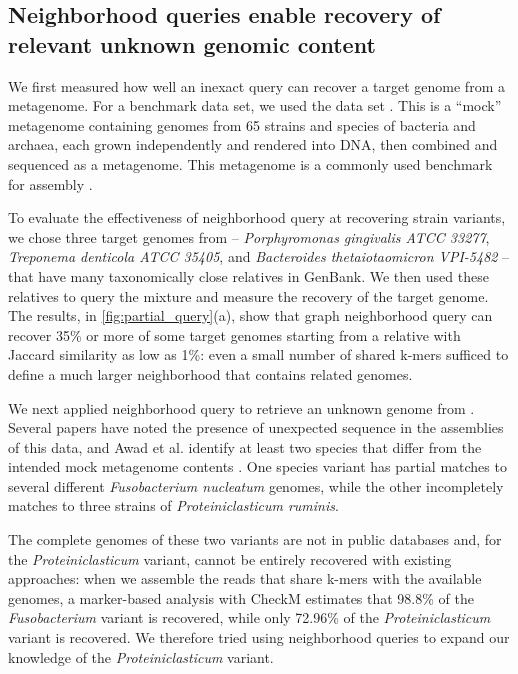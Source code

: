 

\subsection*{Neighborhood queries enable recovery of relevant unknown genomic content}

We first measured how well an inexact query can recover a target genome
from a metagenome. For a benchmark data set, we used the
\podarv data set \cite{podar}. This is a ``mock'' metagenome containing
genomes from 65 strains and species of bacteria and archaea, each
grown independently and rendered into DNA, then combined and sequenced
as a metagenome.  This metagenome is a commonly used
benchmark for assembly \cite{Awad155358,megahit,Seah2015,nurk2017metaspades}.

To evaluate the effectiveness of neighborhood query at recovering
strain variants,
we chose three target genomes from \podarv -- {\em Porphyromonas
  gingivalis ATCC 33277}, {\em Treponema denticola ATCC 35405}, and
{\em Bacteroides thetaiotaomicron VPI-5482} -- that have many
taxonomically close relatives in GenBank. We then used these relatives
to query the \podarv mixture and measure the recovery of the target
genome.  The results, in \autoref{fig:partial_query}(a), show that
graph neighborhood query can recover 35\% or more of some target genomes
starting from a relative with Jaccard similarity as low as 1\%: even a
small number of shared k-mers sufficed to define a much larger neighborhood
that contains related genomes.


We next applied neighborhood query to retrieve an unknown genome from \podarv.
Several papers have noted the
presence of unexpected sequence in the assemblies of this data, and
Awad et al. identify at least two species that differ from
the intended mock metagenome contents \cite{megahit,Awad155358}.  One species
variant has partial matches to several different {\em
  Fusobacterium nucleatum} genomes, while the other incompletely matches to
three strains of
{\em Proteiniclasticum ruminis}.

The complete genomes of these two variants are not in public databases and, for
the {\em Proteiniclasticum} variant, cannot
be entirely recovered with existing approaches: when we
assemble the reads that share k-mers with the available genomes, a
marker-based analysis with CheckM estimates that 98.8\% of the {\em
  Fusobacterium} variant is recovered, while only 72.96\% of the {\em
  Proteiniclasticum} variant is recovered. We therefore tried using
neighborhood queries to expand our knowledge of the {\em Proteiniclasticum} variant.

